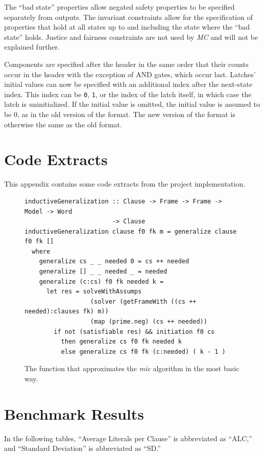 \documentclass[12pt,a4paper,twoside,openright]{report}
\begin{document}
{{{The ``bad state'' properties allow negated safety properties to be specified
separately from outputs.
The invariant constraints allow for the specification of properties that
hold at all states up to and including the state where the ``bad state''
holds.
Justice and fairness constraints are not used by
\emph{MC} and will not be explained further.

Components are specified after the header in the same order that their
counts occur in the header with the exception of AND gates, which
occur last. Latches' initial values can now be specified
with an additional index after the next-state index.
This index can be \verb,0,, \verb,1,, or the index of the latch itself,
in which case the latch is uninitialized.
If the initial value is omitted, the initial value is assumed to be
0, as in the old version of the format.
The new version of the format is otherwise
the same as the old format.}

\chapter{Code Extracts}
This appendix contains some code extracts from the project implementation.

\begin{figure}[H]
\centering
\begin{lstlisting}
inductiveGeneralization :: Clause -> Frame -> Frame -> Model -> Word
                        -> Clause
inductiveGeneralization clause f0 fk m = generalize clause f0 fk []
  where
    generalize cs _ _ needed 0 = cs ++ needed
    generalize [] _ _ needed _ = needed
    generalize (c:cs) f0 fk needed k = 
      let res = solveWithAssumps
                  (solver (getFrameWith ((cs ++ needed):clauses fk) m))
                  (map (prime.neg) (cs ++ needed))
        if not (satisfiable res) && initiation f0 cs
          then generalize cs f0 fk needed k
          else generalize cs f0 fk (c:needed) ( k - 1 ) 
\end{lstlisting}
\caption{The function that approximates the {\it mic} algorithm in the most basic way.}
\label{inductiveGeneralization}
\end{figure}


\chapter{Benchmark Results}
\label{benchmarks}

In the following tables, ``Average Literals per Clause'' is abbreviated as
``ALC,'' and ``Standard Deviation'' is abbreviated as ``SD.''

}}
\end{document}
